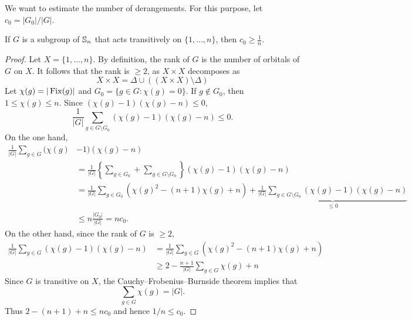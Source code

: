 We want to estimate the number of derangements. For this purpose, let $c_0 = |G_0| / |G|$.



\begin{theorem}
    \label{thm:CameronCohen}
    If $G$ is a subgroup of $\mathbb{S}_n$ that acts transitively on 
    $\{1,\dots,n\}$, then $c_0\geq\frac{1}{n}$.
\end{theorem}

\begin{proof}
    Let $X=\{1,\dots,n\}$. By definition, the rank of $G$ is the number
    of orbitals of $G$ on $X$. It follows that the rank is $\geq2$, as
    $X\times X$ decomposes as 
    \[
    X\times X=\Delta\cup\left((X\times X)\setminus\Delta\right)
    \]
    Let $\chi(g)=|\operatorname{Fix}(g)|$ and $G_0=\{g\in G:\chi(g)=0\}$. If $g\not\in G_0$, then $1\leq\chi(g)\leq n$. Since  
    $(\chi(g)-1)(\chi(g)-n)\leq 0$,
    \[
    \frac{1}{|G|}\sum_{g\in G\setminus G_0}(\chi(g)-1)(\chi(g)-n)\leq 0.
    \]
    On the one hand, 
    \begin{align*}
    \frac{1}{|G|}\sum_{g\in G}(\chi(g)&-1)(\chi(g)-n)\\
    &=\frac{1}{|G|}\left\{\sum_{g\in G_0}+\sum_{g\in G\setminus G_0}\right\}(\chi(g)-1)(\chi(g)-n)\\
    &=\frac{1}{|G|}\sum_{g\in G_0}(\chi(g)^2-(n+1)\chi(g)+n)
    +\underbrace{\frac{1}{|G|}\sum_{g\in G\setminus G_0}(\chi(g)-1)(\chi(g)-n)}_{\leq0}\\
    &\leq n\frac{|G_0|}{|G|}=nc_0.
    \end{align*}
    On the other hand, since the rank of $G$ is $\geq2$, 
    \begin{align*}
        \frac{1}{|G|}\sum_{g\in G}(\chi(g)-1)(\chi(g)-n)
        &=\frac{1}{|G|}\sum_{g\in G}(\chi(g)^2-(n+1)\chi(g)+n)\\
        &\geq 2-\frac{n+1}{|G|}\sum_{g\in G}\chi(g)+n
    \end{align*}
    Since $G$ is transitive on $X$, the Cauchy--Frobenius--Burnside theorem implies that
    \[
    \sum_{g\in G}\chi(g)=|G|.
    \]
    Thus $2-(n+1)+n\leq nc_0$ and hence
    $1/n\leq c_0$. 
\end{proof}

